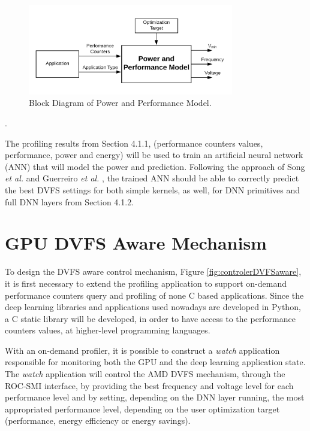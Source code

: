 \begin{figure}[!htb]
  \centering
  \includegraphics[width=0.8\textwidth]{Figures/Proposel/model.png}
  \caption[Controller]{Block Diagram of Power and Performance Model.}
  \label{fig:model}
\end{figure}. 

The profiling results from Section 4.1.1,  (performance counters values, performance, power and energy) will be used to train an artificial neural network (ANN) that will model the power and prediction. Following the approach of Song \textit{et al.} \cite{song_simplified_2013} and Guerreiro  \textit{et al.} \cite{guerreiro_modeling_2019}, the trained ANN should be able to correctly predict the best DVFS settings for both simple kernels, as well, for DNN primitives and full DNN layers from Section 4.1.2.

\section{GPU DVFS Aware Mechanism}
\label{section:DVFSaware}

To design the DVFS aware control mechanism, Figure \ref{fig:controlerDVFSaware}, it is first necessary to extend the profiling application to support on-demand performance counters query and profiling of none C based applications. Since the deep learning libraries and applications used nowadays are developed in Python, a C static library will be developed, in order to have access to the performance counters values, at higher-level programming languages.

With an on-demand profiler, it is possible to construct a \textit{watch} application responsible for monitoring both the GPU and the deep learning application state. The \textit{watch} application will control the AMD DVFS mechanism, through the ROC-SMI interface, by providing the best frequency and voltage level for each performance level and by setting, depending on the DNN layer running, the most appropriated performance level, depending on the user optimization target (performance, energy efficiency or energy savings).

